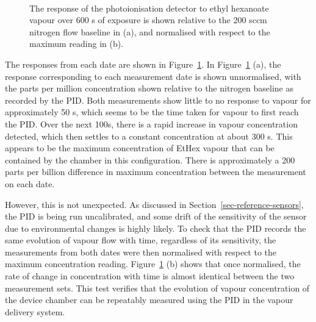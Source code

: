 \documentclass[
  a4paper,
]{scrbook}
\begin{document}
\begin{figure}
\begin{minipage}[t]{0.70\linewidth}
{{}

}

\end{minipage}%
%
\begin{minipage}[t]{0.15\linewidth}

{\centering 

~

}

\end{minipage}%

\caption[The response of the photoionisation detector to ethyl hexanoate
vapour relative to the 200 sccm nitrogen flow baseline over 600 s of
exposure, both unnormalised and normalised to the maximum
reading.]{\label{fig-PID-EtHex-response}The response of the
photoionisation detector to ethyl hexanoate vapour over 600 s of
exposure is shown relative to the 200 sccm nitrogen flow baseline in
(a), and normalised with respect to the maximum reading in (b).}

\end{figure}

The responses from each date are shown in
Figure~\ref{fig-PID-EtHex-response}. In
Figure~\ref{fig-PID-EtHex-response} (a), the response corresponding to
each measurement date is shown unnormalised, with the parts per million
concentration shown relative to the nitrogen baseline as recorded by the
PID. Both measurements show little to no response to vapour for
approximately 50 s, which seems to be the time taken for vapour to first
reach the PID. Over the next 100s, there is a rapid increase in vapour
concentration detected, which then settles to a constant concentration
at about 300 s. This appears to be the maximum concentration of EtHex
vapour that can be contained by the chamber in this configuration. There
is approximately a 200 parts per billion difference in maximum
concentration between the measurement on each date.

However, this is not unexpected. As discussed in
Section~\ref{sec-reference-sensors}, the PID is being run uncalibrated,
and some drift of the sensitivity of the sensor due to environmental
changes is highly likely. To check that the PID records the same
evolution of vapour flow with time, regardless of its sensitivity, the
measurements from both dates were then normalised with respect to the
maximum concentration reading. Figure~\ref{fig-PID-EtHex-response} (b)
shows that once normalised, the rate of change in concentration with
time is almost identical between the two measurement sets. This test
verifies that the evolution of vapour concentration of the device
chamber can be repeatably measured using the PID in the vapour delivery
system.
\end{document}
